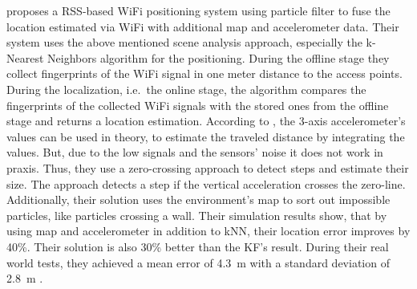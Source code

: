 \citet{wang:wlan} proposes a \acs{RSS}-based WiFi positioning system using particle filter to fuse the location estimated via WiFi with additional map and accelerometer data. Their system uses the above mentioned scene analysis approach, especially the k-Nearest Neighbors algorithm for the positioning. During the offline stage they collect fingerprints of the WiFi signal in one meter distance to the access points. During the localization, i.e.\ the online stage, the algorithm compares the fingerprints of the collected WiFi signals with the stored ones from the offline stage and returns a location estimation. According to \citet{wang:wlan}, the 3-axis accelerometer's values can be used in theory, to estimate the traveled distance by integrating the values. But, due to the low signals and the sensors' noise it does not work in praxis. Thus, they use a zero-crossing approach to detect steps and estimate their size. The approach detects a step if the vertical acceleration crosses the zero-line. Additionally, their solution uses the environment's map to sort out impossible particles, like particles crossing a wall.
Their simulation results show, that by using map and accelerometer in addition to kNN, their location error improves by 40\%. Their solution is also 30\% better than the \ac{KF}'s result. During their real world tests, they achieved a mean error of 4.3~m with a standard deviation of 2.8~m \citep{wang:wlan}.

